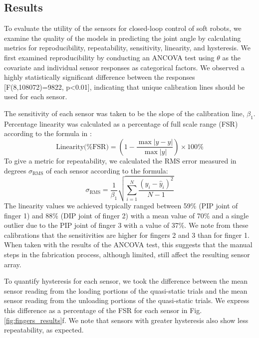 \subsection{Results}
To evaluate the utility of the sensors for closed-loop control of soft robots, we examine the quality of the models in predicting the joint angle by calculating metrics for reproducibility, repeatability, sensitivity, linearity, and hysteresis. We first examined reproducibility by conducting an ANCOVA test using $\theta$ as the covariate and individual sensor responses as categorical factors. We observed a highly statistically significant difference between the responses [F(8,108072)=9822, p\textless 0.01], indicating that unique calibration lines should be used for each sensor. 

The sensitivity of each sensor was taken to be the slope of the calibration line, $\beta_1$. Percentage linearity was calculated as a percentage of full scale range (FSR) according to the formula in \cite{Fleming2013}: \begin{equation}
    \textrm{Linearity(\% FSR)}=\left(1-\frac{\max|y-\hat{y}|}{\max |y|}\right)\times 100\%
\end{equation}
To give a metric for repeatability, we calculated the RMS error measured in degrees $\sigma_\textrm{RMS}$ of each sensor according to the formula:
\begin{equation}
    \sigma_\textrm{RMS}=\frac{1}{\beta_1}\sqrt{\sum_{i=1}^N\frac{\left(y_i-\hat{y}_i\right)^2}{N-1}}
\end{equation}
The linearity values we achieved typically ranged between 59\% (PIP joint of finger 1) and 88\% (DIP joint of finger 2) with a mean value of 70\% and a single outlier due to the PIP joint of finger 3 with a value of 37\%. We note from these calibrations that the sensitivities are higher for fingers 2 and 3 than for finger 1. When taken with the results of the ANCOVA test, this suggests that the manual steps in the fabrication process, although limited, still affect the resulting sensor array.

To quantify hysteresis for each sensor, we took the difference between the mean sensor reading from the loading portions of the quasi-static trials and the mean sensor reading from the unloading portions of the quasi-static trials. We express this difference as a percentage of the FSR for each sensor in Fig. \ref{fig:fingers_results}f. We note that sensors with greater hysteresis also show less repeatability, as expected. 

